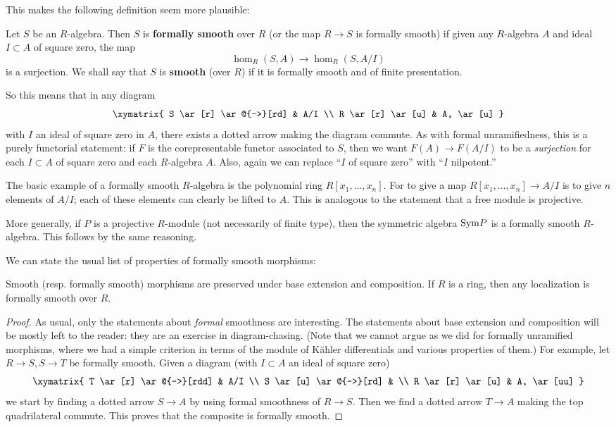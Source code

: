 This makes the following definition seem more plausible:

\begin{definition} 
Let $S$ be an $R$-algebra. Then $S$ is \textbf{formally smooth} over $R$ (or
the map $R \to S$ is formally smooth) if given any
$R$-algebra $A$ and ideal $I \subset A $ of square zero, the map
\[ \hom_R(S, A) \to \hom_R(S, A/I)\]
is a surjection.
We shall say that $S$ is \textbf{smooth} (over $R$) if it is formally smooth and of finite
presentation.
\end{definition} 

So this means that in any diagram 
$$
\xymatrix{
S \ar[r] \ar@{-->}[rd] & A/I \\
R \ar[r] \ar[u] & A, \ar[u]
}
$$
with $I$ an ideal of square zero in $A$, there exists a dotted arrow making the diagram commute.
As with formal unramifiedness, this is a purely functorial statement: if $F$ is
the corepresentable functor associated to $S$, then we want $F(A) \to F(A/I)$
to be a \emph{surjection} for each $I \subset A$ of square zero and each
$R$-algebra $A$. Also, again we can replace ``$I$ of square zero'' with ``$I$
nilpotent.''


\begin{example}
The basic example of a formally smooth $R$-algebra is the polynomial ring
$R[x_1, \dots, x_n]$. For to give a map $R[x_1, \dots, x_n] \to A/I$ is to give
$n$ elements of $A/I$; each of these elements can clearly be lifted to $A$.
This is analogous to the statement that a free module is projective.

More generally, if $P$ is a projective $R$-module (not necessarily of finite
type), then the symmetric algebra $\mathrm{Sym} P$ is a formally smooth $R$-algebra.
This follows by the same reasoning. 
\end{example}

We can state the usual list of properties of formally smooth morphisms:

\begin{proposition}
\label{smoothsorite}
Smooth (resp. formally smooth) morphisms are preserved under base extension and
composition.
If $R$ is a ring, then any localization  is formally smooth over $R$.
\end{proposition} 
\begin{proof}  As usual, only the statements about \emph{formal} smoothness are
interesting.
The statements about base extension and composition will be mostly left to the reader:
they are an exercise in diagram-chasing. (Note that we cannot argue as we did
for formally unramified morphisms, where we had a simple criterion in terms of
the module of K\"ahler differentials and various properties of them.) 
For example, let $R \to S, S \to T$ be formally smooth. 
Given a diagram (with $I \subset A$ an ideal of square zero)
\[ \xymatrix{
T \ar[r]  \ar@{-->}[rdd]  & A/I \\
S  \ar[u] \ar@{-->}[rd] & \\
R \ar[r] \ar[u] & A, \ar[uu]
}\]
we start by finding a dotted arrow $S \to A$ by using formal smoothness of $R
\to S$. Then we find a dotted arrow $T \to A$ making the top quadrilateral
commute. This proves that the composite is formally smooth. 
\end{proof} 
